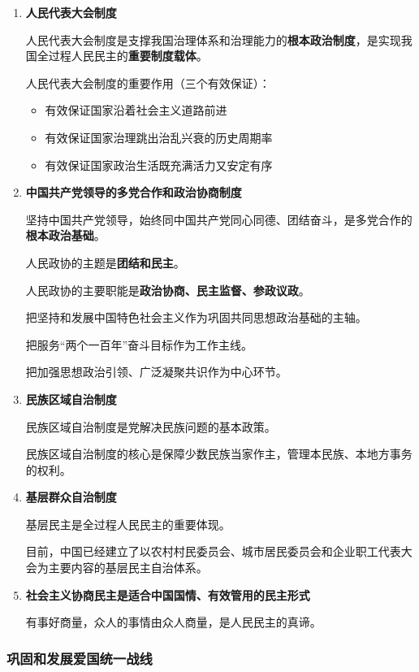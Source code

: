 \documentclass[12pt, a4paper, oneside]{ctexart}
\begin{document}
\begin{enumerate}
  \item {\bf 人民代表大会制度}
  
  人民代表大会制度是支撑我国治理体系和治理能力的\textbf{根本政治制度}，是实现我国全过程人民民主的\textbf{重要制度载体}。

  人民代表大会制度的重要作用（三个有效保证）：
  \begin{itemize}
    \item 有效保证国家沿着社会主义道路前进
    \item 有效保证国家治理跳出治乱兴衰的历史周期率
    \item 有效保证国家政治生活既充满活力又安定有序
  \end{itemize}

  \item {\bf 中国共产党领导的多党合作和政治协商制度}
  
  坚持中国共产党领导，始终同中国共产党同心同德、团结奋斗，是多党合作的\textbf{根本政治基础}。

  人民政协的主题是\textbf{团结和民主}。

  人民政协的主要职能是\textbf{政治协商、民主监督、参政议政}。

  把坚持和发展中国特色社会主义作为巩固共同思想政治基础的主轴。

  把服务“两个一百年”奋斗目标作为工作主线。

  把加强思想政治引领、广泛凝聚共识作为中心环节。

  \item {\bf 民族区域自治制度}
  
  民族区域自治制度是党解决民族问题的基本政策。

  民族区域自治制度的核心是保障少数民族当家作主，管理本民族、本地方事务的权利。

  \item {\bf 基层群众自治制度}
  
  基层民主是全过程人民民主的重要体现。

  目前，中国已经建立了以农村村民委员会、城市居民委员会和企业职工代表大会为主要内容的基层民主自治体系。

  \item {\bf 社会主义协商民主是适合中国国情、有效管用的民主形式}
  
  有事好商量，众人的事情由众人商量，是人民民主的真谛。
\end{enumerate}

\subsubsection{巩固和发展爱国统一战线}
\end{document}
